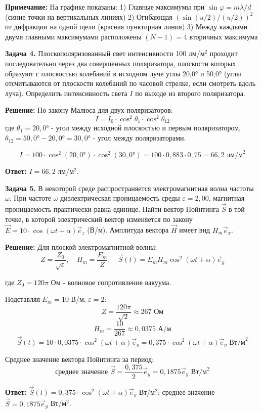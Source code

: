 \documentclass[10pt]{article}
\begin{document}
\textbf{Примечание:} На графике показаны:
1) Главные максимумы при $\sin\varphi = m\lambda/d$ (синие точки на вертикальных линиях)
2) Огибающая $(\sin(u/2)/(u/2))^2$ от дифракции на одной щели (красная пунктирная линия)
3) Между каждыми двумя главными максимумами расположены $(N-1)=4$ вторичных максимума

\vspace{0.8cm}

\textbf{Задача 4.} Плоскополяризованный свет интенсивности 100 лм/м$^2$ проходит последовательно через два совершенных поляризатора, плоскости которых образуют с плоскостью колебаний в исходном луче углы 20,0° и 50,0° (углы отсчитываются от плоскости колебаний по часовой стрелке, если смотреть вдоль луча). Определить интенсивность света $I$ по выходе из второго поляризатора.

\textbf{Решение:}
По закону Малюса для двух поляризаторов:
$$I = I_0 \cdot \cos^2\theta_1 \cdot \cos^2\theta_{12}$$
где $\theta_1 = 20,0°$ - угол между исходной плоскостью и первым поляризатором, $\theta_{12} = 50,0° - 20,0° = 30,0°$ - угол между поляризаторами.

$$I = 100 \cdot \cos^2(20,0°) \cdot \cos^2(30,0°) = 100 \cdot 0,883 \cdot 0,75 = 66,2 \text{ лм/м}^2$$

\textbf{Ответ:} $I = 66,2$ лм/м$^2$.

\vspace{0.8cm}

\textbf{Задача 5.} В некоторой среде распространяется электромагнитная волна частоты $\omega$. При частоте $\omega$ диэлектрическая проницаемость среды $\varepsilon = 2,00$, магнитная проницаемость практически равна единице. Найти вектор Пойнтинга $\vec{S}$ в той точке, в которой электрический вектор изменяется по закону $\vec{E} = 10 \cdot \cos(\omega t+\alpha)\vec{e}_z$ (В/м). Амплитуда вектора $\vec{H}$ имеет вид $H_m\vec{e}_x$.

\textbf{Решение:}
Для плоской электромагнитной волны:
$$Z = \frac{Z_0}{\sqrt{\varepsilon}}, \quad H_m = \frac{E_m}{Z}, \quad \vec{S}(t) = E_m H_m \cos^2(\omega t+\alpha) \vec{e}_y$$

где $Z_0 = 120\pi$ Ом - волновое сопротивление вакуума.

Подставляя $E_m = 10$ В/м, $\varepsilon = 2$:
$$Z = \frac{120\pi}{\sqrt{2}} \approx 267 \text{ Ом}$$
$$H_m = \frac{10}{267} \approx 0,0375 \text{ А/м}$$
$$\vec{S}(t) = 10 \cdot 0,0375 \cdot \cos^2(\omega t+\alpha) \vec{e}_y = 0,375 \cdot \cos^2(\omega t+\alpha) \vec{e}_y \text{ Вт/м}^2$$

Среднее значение вектора Пойнтинга за период:
$$\text{среднее значение } \vec{S} = \frac{0,375}{2} \vec{e}_y = 0,1875 \vec{e}_y \text{ Вт/м}^2$$

\textbf{Ответ:} $\vec{S}(t) = 0,375 \cdot \cos^2(\omega t+\alpha) \vec{e}_y$ Вт/м$^2$; среднее значение $\vec{S} = 0,1875 \vec{e}_y$ Вт/м$^2$.
\end{document}

